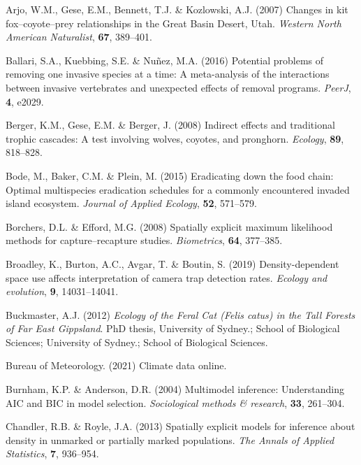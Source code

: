 \documentclass[]{elsarticle} %
\begin{document}
\leavevmode\hypertarget{ref-arjo2007changes}{}%
Arjo, W.M., Gese, E.M., Bennett, T.J. \& Kozlowski, A.J. (2007) Changes in kit fox--coyote--prey relationships in the Great Basin Desert, Utah. \emph{Western North American Naturalist}, \textbf{67}, 389--401.

\leavevmode\hypertarget{ref-ballari2016potential}{}%
Ballari, S.A., Kuebbing, S.E. \& Nuñez, M.A. (2016) Potential problems of removing one invasive species at a time: A meta-analysis of the interactions between invasive vertebrates and unexpected effects of removal programs. \emph{PeerJ}, \textbf{4}, e2029.

\leavevmode\hypertarget{ref-berger2008indirect}{}%
Berger, K.M., Gese, E.M. \& Berger, J. (2008) Indirect effects and traditional trophic cascades: A test involving wolves, coyotes, and pronghorn. \emph{Ecology}, \textbf{89}, 818--828.

\leavevmode\hypertarget{ref-bode2015eradicating}{}%
Bode, M., Baker, C.M. \& Plein, M. (2015) Eradicating down the food chain: Optimal multispecies eradication schedules for a commonly encountered invaded island ecosystem. \emph{Journal of Applied Ecology}, \textbf{52}, 571--579.

\leavevmode\hypertarget{ref-borchers2008spatially}{}%
Borchers, D.L. \& Efford, M.G. (2008) Spatially explicit maximum likelihood methods for capture--recapture studies. \emph{Biometrics}, \textbf{64}, 377--385.

\leavevmode\hypertarget{ref-broadley2019density}{}%
Broadley, K., Burton, A.C., Avgar, T. \& Boutin, S. (2019) Density-dependent space use affects interpretation of camera trap detection rates. \emph{Ecology and evolution}, \textbf{9}, 14031--14041.

\leavevmode\hypertarget{ref-buckmaster2012ecology}{}%
Buckmaster, A.J. (2012) \emph{Ecology of the Feral Cat \textup{(Felis catus)} in the Tall Forests of Far East Gippsland}. PhD thesis, University of Sydney.; School of Biological Sciences; University of Sydney.; School of Biological Sciences.

\leavevmode\hypertarget{ref-BOM2021}{}%
Bureau of Meteorology. (2021) Climate data online.

\leavevmode\hypertarget{ref-burnham2004multimodel}{}%
Burnham, K.P. \& Anderson, D.R. (2004) Multimodel inference: Understanding AIC and BIC in model selection. \emph{Sociological methods \& research}, \textbf{33}, 261--304.

\leavevmode\hypertarget{ref-chandler2013spatially}{}%
Chandler, R.B. \& Royle, J.A. (2013) Spatially explicit models for inference about density in unmarked or partially marked populations. \emph{The Annals of Applied Statistics}, \textbf{7}, 936--954.
\end{document}
